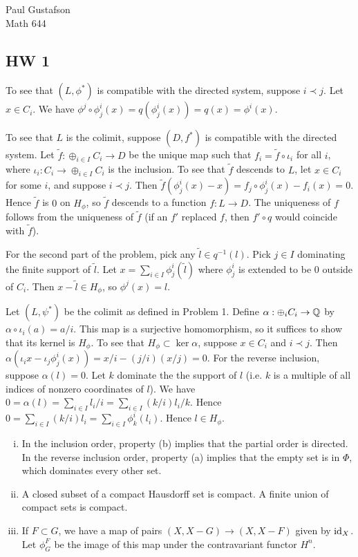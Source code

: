 \documentclass{article}
\begin{document}
\noindent Paul Gustafson\\
\noindent Math 644

\subsection*{HW 1}
 To see that $(L, \phi^*)$ is compatible with the directed system, suppose $i \prec j$. Let $x \in C_i$. We have $\phi^j \circ \phi^i_j(x) = q(\phi^i_j(x)) = q(x) = \phi^i(x)$.

To see that $L$ is the colimit, suppose $(D, f^*)$ is compatible with the directed system. Let $\tilde f: \oplus_{i \in I} C_i \to D$ be the unique map such that $f_i = \tilde f \circ \iota_i$ for all $i$, where $\iota_i: C_i \to \oplus_{i \in I} C_i$ is the inclusion.   To see that $\tilde f$ descends to $L$, let $x \in C_i$ for some $i$, and suppose $i \prec j$.  Then $\tilde f(\phi^i_j(x) - x) = f_j \circ \phi^i_j (x) - f_i(x) = 0$.  Hence $\tilde f$ is $0$ on $H_\phi$, so $\tilde f$ descends to a function $f: L \to D$. The uniqueness of $f$ follows from the uniqueness of $\tilde f$ (if an $f'$ replaced $f$, then $f' \circ q$ would coincide with $\tilde f$).

For the second part of the problem, pick any $\tilde l \in q^{-1}(l)$.  Pick $j \in I$ dominating the finite support of $\tilde l$. Let $x = \sum_{i \in I} \phi^i_j(\tilde l)$ where $\phi^i_j$ is extended to be 0 outside of $C_i$. Then $x - \tilde l \in H_\phi$, so $\phi^j(x) = l$.

 Let $(L, \psi^*)$ be the colimit as defined in Problem 1.  Define $\alpha: \oplus_i C_i \to \mathbb{Q}$ by $\alpha \circ \iota_i(a) = a/i$. This map is a surjective homomorphism, so it suffices to show that its kernel is $H_\phi$. To see that $H_\phi \subset \ker \alpha$, suppose $x \in C_i$ and $i \prec j$.   Then $\alpha(\iota_i x - \iota_j \phi^i_j(x)) = x/i - (j/i)  (x/j) = 0$.  For the reverse inclusion, suppose $\alpha(l) = 0$.  Let $k$ dominate the the support of $l$ (i.e. $k$ is a multiple of all indices of nonzero coordinates of $l$).  We have $0 = \alpha(l) = \sum_{i \in I}  l_i/i= \sum_{i \in I}  (k/i) l_i /k$. Hence $0 = \sum_{i \in I} (k/i) l_i = \sum_{i \in I} \phi^i_k(l_i)$.  Hence $l \in H_\phi$.

 \begin{enumerate}[i.]
\item In the inclusion order, property (b) implies that the partial order is directed.  In the reverse inclusion order, property (a) implies that the empty set is in $\Phi$, which dominates every other set.

\item A closed subset of a compact Hausdorff set is compact. A finite union of compact sets is compact.

\item If $F \subset G$, we have a map of pairs $(X, X - G) \to (X, X - F)$ given by $\operatorname{id}_X$. Let $\phi^F_G$ be the image of this map under the contravariant functor $H^n$.  
\end{enumerate}
\end{document}

